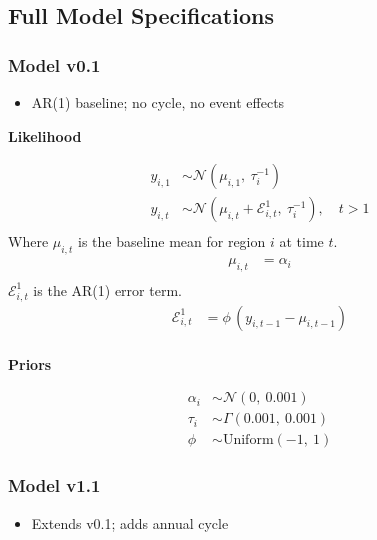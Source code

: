 \documentclass[
]{article}
\providecommand{\tightlist}{%
  \setlength{\itemsep}{0pt}\setlength{\parskip}{0pt}}
\begin{document}
\subsection{Full Model Specifications}\label{full-model-specs}

\subsubsection*{Model v0.1}\label{model-v0.1}

\begin{itemize}
\tightlist
\item
  AR(1) baseline; no cycle, no event effects
\end{itemize}

\textbf{Likelihood}

\[
\begin{aligned}
y_{i,1} &\sim \mathcal{N}(\mu_{i,1},\ \tau_i^{-1}) \\[4pt]
y_{i,t} &\sim \mathcal{N}\!\left(\mu_{i,t} + \mathcal{E}^{1}_{i,t},\ \tau_i^{-1}\right), \quad t > 1\\
\end{aligned}
\]
Where \(\mu_{i,t}\) is the baseline mean for region \(i\) at time \(t\).
\[
\begin{aligned}
\mu_{i,t} &= \alpha_i \\[4pt]
\end{aligned}
\]
\(\mathcal{E}^{1}_{i,t}\) is the AR(1) error term.
\[
\begin{aligned}
\mathcal{E}^{1}_{i,t} &= \phi\,(y_{i,t-1} - \mu_{i,t-1})\\
\end{aligned}
\]

\textbf{Priors}

\[
\begin{aligned}
\alpha_i &\sim \mathcal{N}(0,\ 0.001) \\[4pt]
\tau_i   &\sim \Gamma(0.001,\ 0.001) \\[4pt]
\phi     &\sim \mathrm{Uniform}(-1,\ 1)
\end{aligned}
\]

\subsubsection*{Model v1.1}\label{model-v1.1}

\begin{itemize}
\tightlist
\item
  Extends v0.1; adds annual cycle
\end{itemize}
\end{document}
